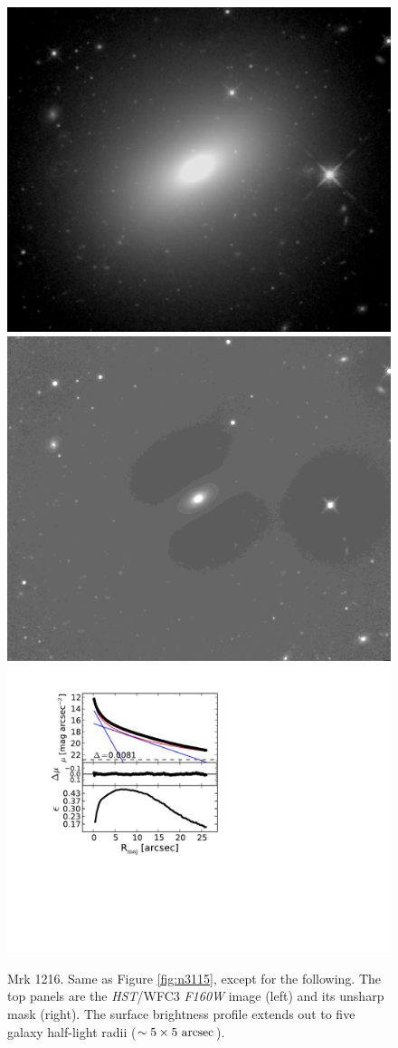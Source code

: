 \documentclass[useAMS,usenatbib,article]{mn2e}
\begin{document}
\begin{figure}
\begin{center}
\includegraphics[width=0.49\columnwidth]{images/mrk1216_image.jpeg}
\includegraphics[width=0.49\columnwidth]{images/mrk1216_unsharp.jpeg} \\
\includegraphics[width=1.05\columnwidth]{images/mrk1216_decomposition.pdf}
\caption{Mrk 1216. 
Same as Figure \ref{fig:n3115}, except for the following. 
The top panels are the \emph{HST}/WFC3 \emph{F160W} image (left) and its unsharp mask (right).
The surface brightness profile extends out to five galaxy half-light radii ($\sim 5 \times 5~\rm arcsec$). 
}
\end{center}
\end{figure}
\end{document}
